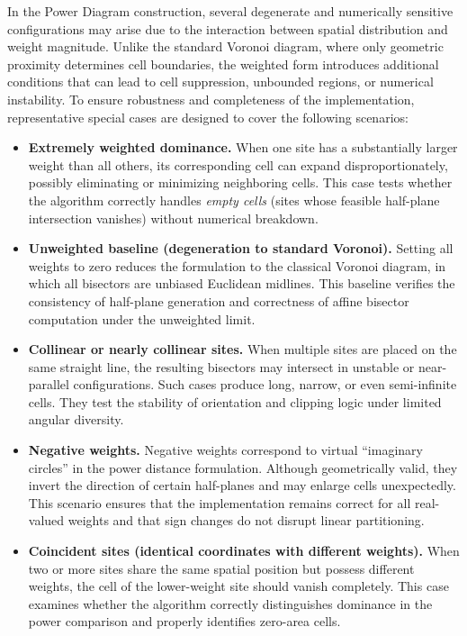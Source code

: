 \documentclass{article}
\begin{document}
In the Power Diagram construction, several degenerate and numerically sensitive configurations may arise due to the interaction between spatial distribution and weight magnitude.  
Unlike the standard Voronoi diagram, where only geometric proximity determines cell boundaries, the weighted form introduces additional conditions that can lead to cell suppression, unbounded regions, or numerical instability.  
To ensure robustness and completeness of the implementation, representative special cases are designed to cover the following scenarios:

\begin{itemize}
    \item \textbf{Extremely weighted dominance.}  
    When one site has a substantially larger weight than all others, its corresponding cell can expand disproportionately, possibly eliminating or minimizing neighboring cells.  
    This case tests whether the algorithm correctly handles \emph{empty cells} (sites whose feasible half-plane intersection vanishes) without numerical breakdown.

    \item \textbf{Unweighted baseline (degeneration to standard Voronoi).}  
    Setting all weights to zero reduces the formulation to the classical Voronoi diagram, in which all bisectors are unbiased Euclidean midlines.  
    This baseline verifies the consistency of half-plane generation and correctness of affine bisector computation under the unweighted limit.

    \item \textbf{Collinear or nearly collinear sites.}  
    When multiple sites are placed on the same straight line, the resulting bisectors may intersect in unstable or near-parallel configurations.  
    Such cases produce long, narrow, or even semi-infinite cells.  
    They test the stability of orientation and clipping logic under limited angular diversity.

    \item \textbf{Negative weights.}  
    Negative weights correspond to virtual “imaginary circles” in the power distance formulation.  
    Although geometrically valid, they invert the direction of certain half-planes and may enlarge cells unexpectedly.  
    This scenario ensures that the implementation remains correct for all real-valued weights and that sign changes do not disrupt linear partitioning.

    \item \textbf{Coincident sites (identical coordinates with different weights).}  
    When two or more sites share the same spatial position but possess different weights, the cell of the lower-weight site should vanish completely.  
    This case examines whether the algorithm correctly distinguishes dominance in the power comparison and properly identifies zero-area cells.

\end{itemize}
\end{document}
